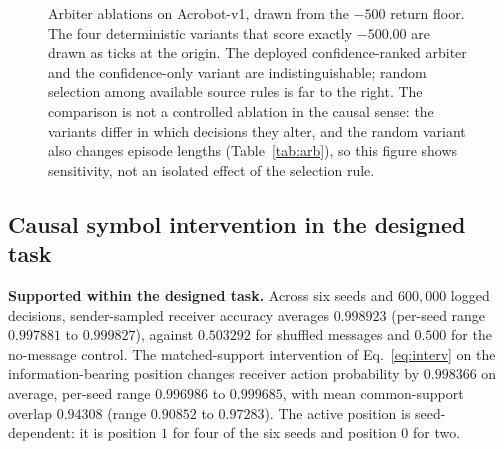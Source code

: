 \documentclass[11pt,a4paper]{article}
\begin{document}
\begin{figure}[t]
\centering
{}
\caption{Arbiter ablations on Acrobot-v1, drawn from the $-500$ return floor. The four deterministic variants that score exactly $-500.00$ are drawn as ticks at the origin. The deployed confidence-ranked arbiter and the confidence-only variant are indistinguishable; random selection among available source rules is far to the right. The comparison is not a controlled ablation in the causal sense: the variants differ in which decisions they alter, and the random variant also changes episode lengths (Table~\ref{tab:arb}), so this figure shows sensitivity, not an isolated effect of the selection rule.}
\label{fig:arb}
\end{figure}

\subsection{Causal symbol intervention in the designed task}
\label{sec:res-interv}

\textbf{Supported within the designed task.} Across six seeds and $600{,}000$ logged decisions, sender-sampled receiver accuracy averages $0.998923$ (per-seed range $0.997881$ to $0.999827$), against $0.503292$ for shuffled messages and $0.500$ for the no-message control. The matched-support intervention of Eq.~\eqref{eq:interv} on the information-bearing position changes receiver action probability by $0.998366$ on average, per-seed range $0.996986$ to $0.999685$, with mean common-support overlap $0.94308$ (range $0.90852$ to $0.97283$). The active position is seed-dependent: it is position $1$ for four of the six seeds and position $0$ for two.
\end{document}
